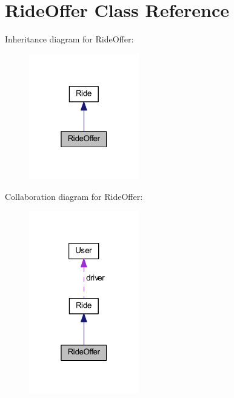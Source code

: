 \hypertarget{class_ride_offer}{}\section{Ride\+Offer Class Reference}
\label{class_ride_offer}


Inheritance diagram for Ride\+Offer\+:
\nopagebreak
\begin{figure}[H]
\begin{center}
\leavevmode
\includegraphics[width=136pt]{class_ride_offer__inherit__graph}
\end{center}
\end{figure}


Collaboration diagram for Ride\+Offer\+:
\nopagebreak
\begin{figure}[H]
\begin{center}
\leavevmode
\includegraphics[width=136pt]{class_ride_offer__coll__graph}
\end{center}
\end{figure}
